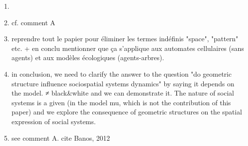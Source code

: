 \documentclass[11pt,a4paper,sans]{moderncv}        %
\begin{document}
\begin{enumerate}
  \item {}
\item cf. comment A
\item reprendre tout le papier pour éliminer les termes indéfinis "space", "pattern" etc. + en conclu mentionner que ça s'applique aux automates cellulaires (sans agents) et aux modèles écologiques (agents-arbres).
  \item in conclusion, we need to clarify the answer to the question "do geometric structure influence sociospatial systems dynamics" by saying it depends on the model. ≠ black\&white and we can demonstrate it. The nature of social systems is a given (in the model mu, which is not the contribution of this paper) and we explore the consequence of geometric structures on the spatial expression of social systems.
  

  \item see comment A. cite Banos, 2012


\end{enumerate}
\end{document}
